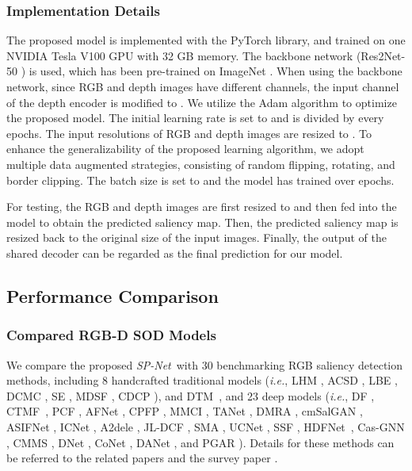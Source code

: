 \documentclass[10pt,twocolumn,letterpaper]{article}
\def\ie{\emph{i.e.}}
\def\ours{\emph{SP-Net}}
\begin{document}
\subsubsection{Implementation Details}

The proposed model is implemented with the PyTorch library, and trained on one NVIDIA Tesla V100 GPU with 32 GB memory. The backbone network (Res2Net-50 \cite{pami20Res2net}) is used, which has been pre-trained on ImageNet \cite{russakovsky2015imagenet}. When using the backbone network, since RGB and depth images have different channels, the input channel of the depth encoder is modified to . We utilize the Adam algorithm to optimize the proposed model. The initial learning rate is set to  and is divided by  every  epochs. The input resolutions of RGB and depth images are resized to . To enhance the generalizability of the proposed learning algorithm, we adopt multiple data augmented strategies, consisting of random flipping, rotating, and border clipping. The batch size is set to  and the model has trained over  epochs.

For testing, the RGB and depth images are first resized to  and then fed into the model to obtain the predicted saliency map. Then, the predicted saliency map is resized back to the original size of the input images. Finally, the output of the shared decoder can be regarded as the final prediction for our model.


\subsection{Performance Comparison}
\label{results}


\subsubsection{Compared RGB-D SOD Models}

We compare the proposed \ours~with 30 benchmarking RGB saliency detection methods, including 8 handcrafted traditional models (\ie, LHM \cite{peng2014rgbd}, ACSD \cite{ju2014depth}, LBE \cite{feng2016local}, DCMC \cite{cong2016saliency}, SE \cite{guo2016salient}, MDSF \cite{song2017depth}, CDCP \cite{zhu2017innovative}), and DTM~\cite{cong2019going}, and 23 deep models (\ie, DF \cite{qu2017rgbd}, CTMF~\cite{han2017cnns}, PCF \cite{chen2018progressively}, AFNet \cite{wang2019adaptive}, CPFP \cite{zhao2019contrast}, MMCI \cite{chen2019multi}, TANet \cite{chen2019three}, DMRA \cite{piao2019depth}, cmSalGAN \cite{jiang2020cmsalgan}, ASIFNet \cite{li2020asif}, ICNet \cite{li2020icnet}, A2dele \cite{piao2020}, JL-DCF \cite{fu2020jl}, SMA \cite{liu2020}, UCNet \cite{zhang2020uc}, SSF \cite{zhang2020}, HDFNet~\cite{paneccv2020}, Cas-GNN \cite{luoECCV2020}, CMMS \cite{li2020}, DNet \cite{fan2019rethinking}, CoNet \cite{Wei_2020_ECCV}, DANet \cite{zhaoeccv20}, and PGAR \cite{chen2020progressively}). Details for these methods can be referred to the related papers and the survey paper \cite{zhou2021rgb}.
\end{document}
